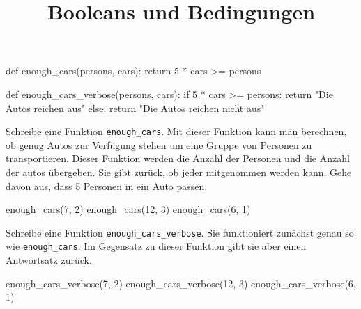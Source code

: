 \documentclass[a4paper, fontsize = 13, DIV = calc]{scrartcl}
\title{Booleans und Bedingungen}
\date{}
\newcommand{\expandpyconc}[1]{\expandafter\reallyexpandpyconc\expandafter{#1}}
\newcommand{\reallyexpandpyconc}[1]{\pyconc{exec(compile(open('#1', 'rb').read(), '#1', 'exec'))}}
\newenvironment{pyconcodeblck}[1]
{\newcommand{\snippetfile}{snippet-#1.py}
	\VerbatimEnvironment
	\begin{VerbatimOut}{\snippetfile}}
	{\end{VerbatimOut}
	\expandpyconc{\snippetfile}}
\begin{document}
\begin{pyconcodeblck}{temp}
def enough_cars(persons, cars):
	return 5 * cars >= persons
	
def enough_cars_verbose(persons, cars):
    if 5 * cars >= persons:
        return "Die Autos reichen aus"
    else:
        return "Die Autos reichen nicht aus"
\end{pyconcodeblck}





\begin{aufgabe} \noindent 
Schreibe eine Funktion \texttt{enough_cars}. Mit dieser Funktion kann man berechnen, ob genug Autos zur Verfügung stehen um eine Gruppe von Personen zu transportieren. Dieser Funktion werden die Anzahl der Personen und die Anzahl der autos übergeben. Sie gibt zurück, ob jeder mitgenommen werden kann. Gehe davon aus, dass 5 Personen in ein Auto passen.
\begin{pyconsole}
enough_cars(7, 2)
enough_cars(12, 3)
enough_cars(6, 1)
\end{pyconsole}
\end{aufgabe}


\begin{aufgabe} \noindent 
Schreibe eine Funktion \texttt{enough_cars_verbose}. Sie funktioniert zunächst genau so wie \texttt{enough_cars}. Im Gegensatz zu dieser Funktion gibt sie aber einen Antwortsatz zurück.
\begin{pyconsole}
enough_cars_verbose(7, 2)
enough_cars_verbose(12, 3)
enough_cars_verbose(6, 1)
\end{pyconsole}
\end{aufgabe}



\newpage
\end{document}
